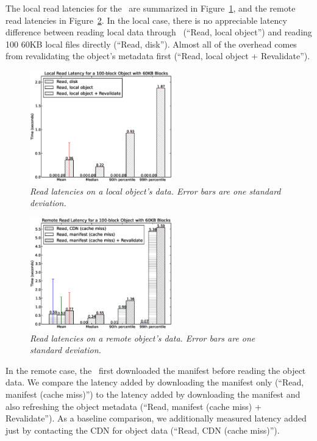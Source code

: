 The local read latencies for the \SGs\ are summarized
in Figure~\ref{fig:read_latency_local}, and 
the remote read latencies in Figure~\ref{fig:read_latency_remote}.  In the local case,
there is no appreciable latency difference between reading local data through
\Syndicate\ (``Read, local object'') and reading 100 60KB local files directly (``Read, disk'').
Almost all of the overhead comes from revalidating the object's metadata first
(``Read, local object + Revalidate'').

\begin{figure}[h!]
\centerline{\includegraphics[width=0.55\textwidth]{figures/read_latency_local}}
\caption{\it Read latencies on a local object's data.  Error bars are one standard deviation.}
\label{fig:read_latency_local}
\end{figure}


\begin{figure}[h!]
\centerline{\includegraphics[width=0.55\textwidth]{figures/read_latency_remote}}
\caption{\it Read latencies on a remote object's data.  Error bars are one standard deviation.}
\label{fig:read_latency_remote}
\end{figure}

In the remote case, the \SG\ first downloaded the manifest before reading 
the object data.  We compare the latency added by downloading the manifest only
(``Read, manifest (cache miss)'') to the latency added by downloading the
manifest and also refreshing the object 
metadata (``Read, manifest (cache miss) + Revalidate'').  As a baseline comparison,
we additionally measured latency added just by contacting the CDN for object data
(``Read, CDN (cache miss)'').

